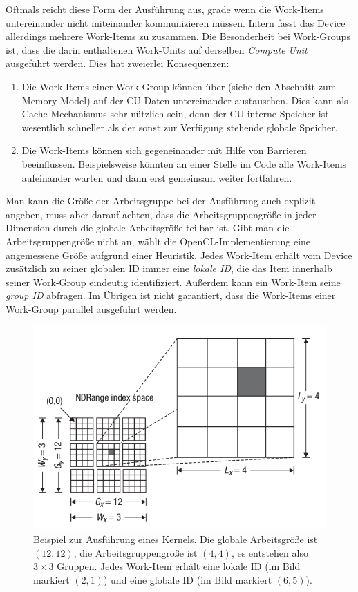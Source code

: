 Oftmals reicht diese Form der Ausführung aus, grade wenn die
Work-Items untereinander nicht miteinander kommunizieren
müssen. Intern fasst das Device allerdings mehrere Work-Items zu
 zusammen. Die Besonderheit bei
Work-Groups ist, dass die darin enthaltenen Work-Units auf derselben
\emph{Compute Unit} ausgeführt werden. Dies hat zweierlei
Konsequenzen:

\begin{enumerate}
\item Die Work-Items einer Work-Group können über  (siehe den Abschnitt zum Memory-Model) auf der CU Daten
untereinander austauschen. Dies kann als Cache-Mechanismus sehr nützlich
sein, denn der CU-interne Speicher ist wesentlich schneller als der
sonst zur Verfügung stehende globale Speicher.
\item Die Work-Items können sich gegeneinander mit Hilfe von Barrieren
beeinflussen. Beispielsweise könnten an einer Stelle im Code alle
Work-Items aufeinander warten und dann erst gemeinsam weiter fortfahren.
\end{enumerate}

Man kann die Größe der Arbeitsgruppe bei der Ausführung auch explizit
angeben, muss aber darauf achten, dass die Arbeitsgruppengröße in
jeder Dimension durch die globale Arbeitsgröße teilbar ist. Gibt man
die Arbeitsgruppengröße nicht an, wählt die OpenCL-Implementierung
eine angemessene Größe aufgrund einer Heuristik. Jedes Work-Item
erhält vom Device zusätzlich zu seiner globalen ID immer eine
\emph{lokale ID}, die das Item innerhalb seiner Work-Group eindeutig
identifiziert. Außerdem kann ein Work-Item seine \emph{group ID}
abfragen. Im Übrigen ist nicht garantiert, dass die Work-Items einer
Work-Group parallel ausgeführt werden.

\begin{figure}[ht]
\centering
\includegraphics[width=13cm]{images/execution_model}
\caption{Beispiel zur Ausführung eines Kernels. Die globale Arbeitsgröße ist $(12,12)$, die Arbeitsgruppengröße ist $(4,4)$, es entstehen also $3 \times 3$ Gruppen. Jedes Work-Item erhält eine lokale ID (im Bild markiert $(2,1)$) und eine globale ID (im Bild markiert $(6,5)$).}
\label{fig:opencl_execution_model}
\end{figure}

